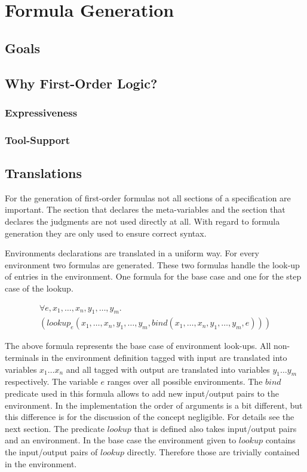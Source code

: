 \chapter{Formula Generation}
\section{Goals}
\section{Why First-Order Logic?}
\subsection{Expressiveness}
\subsection{Tool-Support}
\section{Translations}
For the generation of first-order formulas not all sections of a
specification are important. The section that declares the
meta-variables and the section that declares the judgments are not
used directly at all. With regard to formula generation they are only
used to ensure correct syntax.


Environments declarations are translated in a uniform way. For every
environment two formulas are generated. These two formulas handle the
look-up of entries in the environment. One formula for the base case
and one for the step case of the lookup.

\begin{multline}
  \forall e, x_1, \dots, x_n, y_1, \dots, y_m . \\ (lookup_e(x_1,\dots,x_n,y_1,\dots,y_m, bind(x_1,\dots,x_n,y_1,\dots,y_m,e)))
\end{multline}

The above formula represents the base case of environment
look-ups. All non-terminals in the environment definition tagged with
input are translated into variables $x_1 \dots x_n$ and all tagged
with output are translated into variables $y_1 \dots y_m$
respectively. The variable $e$ ranges over all possible
environments. The $bind$ predicate used in this formula allows to add
new input/output pairs to the environment. In the implementation the
order of arguments is a bit different, but this difference is for the
discussion of the concept negligible. For details see the next
section. The predicate $lookup$ that is defined
also takes input/output pairs and an environment. In the base case the
environment given to $lookup$ contains the input/output pairs of
$lookup$ directly. Therefore those are trivially contained in the
environment.

